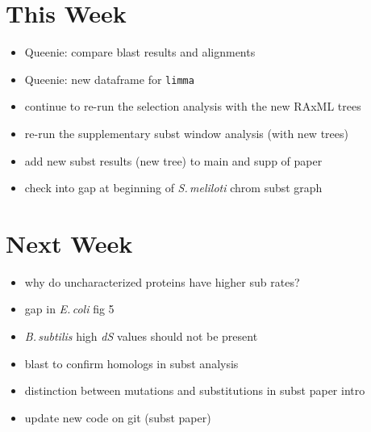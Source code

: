 \documentclass[12pt]{article}
\newcommand{\smel}{\textit{S.\,meliloti}\xspace}
\newcommand{\bass}{\textit{B.\,subtilis}\xspace}
\newcommand{\ecol}{\textit{E.\,coli}\xspace}
\newcommand{\ds}{\textit{dS}\xspace}
\begin{document}

\section*{This Week}
%
\begin{itemize}
	\item Queenie: compare blast results and alignments
	\item Queenie: new dataframe for \texttt{limma}
\item continue to re-run the selection analysis with the new RAxML trees
\item re-run the supplementary subst window analysis (with new trees)
\item add new subst results (new tree) to main and supp of paper
\item check into gap at beginning of \smel chrom subst graph


\end{itemize}


\section*{Next Week}
\begin{itemize}
	\item why do uncharacterized proteins have higher sub rates?
	\item gap in \ecol fig 5
	\item \bass high \ds values should not be present
	\item blast to confirm homologs in subst analysis
	\item distinction between mutations and substitutions in subst paper intro
	\item update new code on git (subst paper)
\end{itemize}
\end{document}
